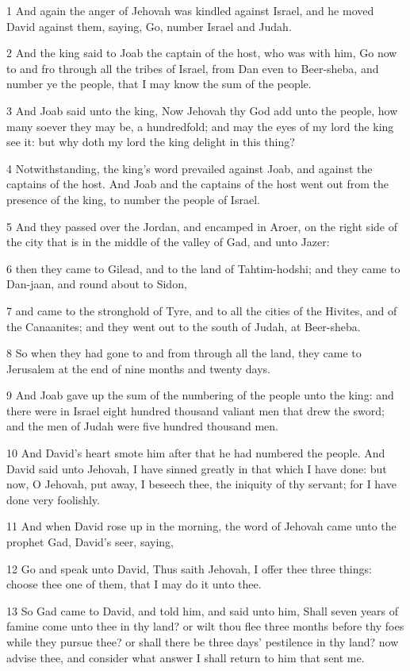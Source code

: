 \par 1 And again the anger of Jehovah was kindled against Israel, and he moved David against them, saying, Go, number Israel and Judah.
\par 2 And the king said to Joab the captain of the host, who was with him, Go now to and fro through all the tribes of Israel, from Dan even to Beer-sheba, and number ye the people, that I may know the sum of the people.
\par 3 And Joab said unto the king, Now Jehovah thy God add unto the people, how many soever they may be, a hundredfold; and may the eyes of my lord the king see it: but why doth my lord the king delight in this thing?
\par 4 Notwithstanding, the king's word prevailed against Joab, and against the captains of the host. And Joab and the captains of the host went out from the presence of the king, to number the people of Israel.
\par 5 And they passed over the Jordan, and encamped in Aroer, on the right side of the city that is in the middle of the valley of Gad, and unto Jazer:
\par 6 then they came to Gilead, and to the land of Tahtim-hodshi; and they came to Dan-jaan, and round about to Sidon,
\par 7 and came to the stronghold of Tyre, and to all the cities of the Hivites, and of the Canaanites; and they went out to the south of Judah, at Beer-sheba.
\par 8 So when they had gone to and from through all the land, they came to Jerusalem at the end of nine months and twenty days.
\par 9 And Joab gave up the sum of the numbering of the people unto the king: and there were in Israel eight hundred thousand valiant men that drew the sword; and the men of Judah were five hundred thousand men.
\par 10 And David's heart smote him after that he had numbered the people. And David said unto Jehovah, I have sinned greatly in that which I have done: but now, O Jehovah, put away, I beseech thee, the iniquity of thy servant; for I have done very foolishly.
\par 11 And when David rose up in the morning, the word of Jehovah came unto the prophet Gad, David's seer, saying,
\par 12 Go and speak unto David, Thus saith Jehovah, I offer thee three things: choose thee one of them, that I may do it unto thee.
\par 13 So Gad came to David, and told him, and said unto him, Shall seven years of famine come unto thee in thy land? or wilt thou flee three months before thy foes while they pursue thee? or shall there be three days' pestilence in thy land? now advise thee, and consider what answer I shall return to him that sent me.
